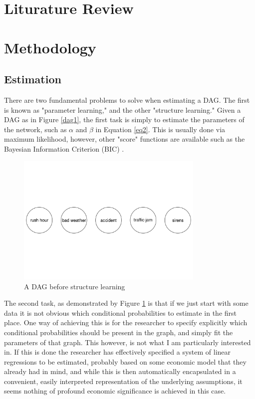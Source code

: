 \documentclass{article}
\begin{document}
\section{Liturature Review}

\section{Methodology}

\subsection{Estimation}

There are two fundamental problems to solve when estimating a DAG. The first is known as "parameter learning," and the other "structure learning." Given a DAG as in Figure \ref{dag1}, the first task is simply to estimate the parameters of the network, such as $\alpha$ and $\beta$ in Equation \ref{eq2}. This is usually done via maximum likelihood, however, other "score" functions are available such as the Bayesian Information Criterion (BIC) \parencite{chen1998speaker}.

\begin{figure}
  \centering
  \includegraphics[width=0.8\textwidth]{images/trafficjam_unfit.png}
  \caption{A DAG before structure learning}
  \label{dag2}
\end{figure}

The second task, as demonstrated by Figure \ref{dag2} is that if we just start with some data it is not obvious which conditional probabilities to estimate in the first place. One way of achieving this is for the researcher to specify explicitly which conditional probabilities should be present in the graph, and simply fit the parameters of that graph. This however, is not what I am particularly interested in. If this is done the researcher has effectively specified a system of linear regressions to be estimated, probably based on some economic model that they already had in mind, and while this is then automatically encapsulated in a convenient, easily interpreted representation of the underlying assumptions, it seems nothing of profound economic significance is achieved in this case. 
\end{document}
